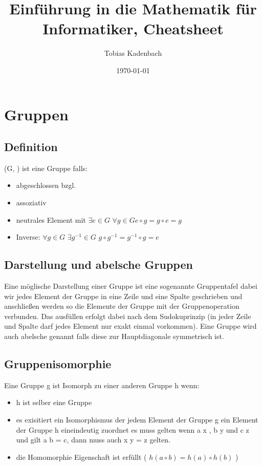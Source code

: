\documentclass[12pt, letterpaper, twoside]{article}
\title{Einführung in die Mathematik für Informatiker, Cheatsheet}
\author{Tobias Kadenbach}
\date{\today}
\begin{document}
\maketitle

\tableofcontents 

\section{Gruppen}
\subsection{Definition}
(G, \circ) ist eine Gruppe falls:
\begin{itemize}
	\item abgeschlossen bzgl. \circ
	\item assoziativ
	\item neutrales Element mit $ \exists e \in G $ $\forall g \in G e \circ g = g \circ e = g $
	\item Inverse: $ \forall g \in G $  $\exists g^{-1}  \in G $ $g \circ g^{-1} = g^{-1} \circ g = e $
\end{itemize}
\subsection{Darstellung und abelsche Gruppen}
\noindent
Eine möglische Darstellung einer Gruppe ist eine sogenannte Gruppentafel dabei wir jedes Element der Gruppe in eine Zeile und eine Spalte geschrieben und anschließen werden so die Elemente der Gruppe mit der Gruppenoperation verbunden. Das ausfüllen erfolgt dabei nach dem Sudokuprinzip (in jeder Zeile und Spalte darf jedes Element nur exakt einmal vorkommen).  
Eine Gruppe wird auch abelsche genannt falls diese zur Hauptdiagonale symmetrisch ist. \\

\subsection{Gruppenisomorphie}
\noindent
Eine Gruppe g ist Isomorph zu einer anderen Gruppe h wenn:
\begin{itemize}
	\item h ist selber eine Gruppe
	\item es exisitiert ein Isomorphismus der jedem Element der Gruppe g ein Element der Gruppe h eineindeutig zuordnet es muss gelten wenn a \mapsto x , b \mapsto y und c \mapsto z und gilt a \circ b = c, dann muss auch x \circ y = z gelten.
	\item die Homomorphie Eigenschaft ist erfüllt ( $ h(a \circ b) = h(a) \circ h(b) $ )
\end{itemize}
\end{document}
